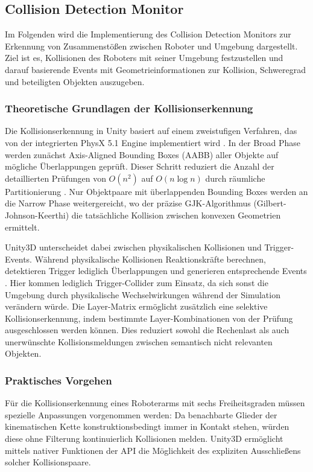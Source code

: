 \subsection{Collision Detection Monitor}
Im Folgenden wird die Implementierung des Collision Detection
Monitors zur Erkennung von Zusammenstößen zwischen
Roboter und Umgebung dargestellt. Ziel ist es, Kollisionen des
Roboters mit seiner Umgebung festzustellen und darauf basierende Events mit
Geometrieinformationen zur Kollision, Schweregrad und beteiligten
Objekten auszugeben.

\subsubsection{Theoretische Grundlagen der Kollisionserkennung}
Die Kollisionserkennung in Unity basiert auf einem zweistufigen Verfahren, das
von der integrierten PhysX 5.1 Engine implementiert wird
. In der Broad Phase werden zunächst
Axis-Aligned Bounding Boxes (AABB) aller Objekte auf mögliche Überlappungen
geprüft. Dieser Schritt reduziert die Anzahl der detaillierten Prüfungen von
$O(n^2)$ auf $O(n \log n)$ durch räumliche Partitionierung
. Nur Objektpaare mit überlappenden Bounding Boxes
werden an die Narrow Phase weitergereicht, wo der präzise
GJK-Algorithmus (Gilbert-Johnson-Keerthi) die tatsächliche Kollision zwischen
konvexen Geometrien ermittelt.

Unity3D unterscheidet dabei zwischen physikalischen Kollisionen und
Trigger-Events. Während physikalische Kollisionen Reaktionskräfte berechnen,
detektieren Trigger lediglich Überlappungen und generieren entsprechende Events
. Hier kommen lediglich Trigger-Collider
zum Einsatz,
da sich sonst die Umgebung durch physikalische Wechselwirkungen während der
Simulation verändern würde. Die Layer-Matrix ermöglicht zusätzlich
eine selektive
Kollisionserkennung, indem bestimmte Layer-Kombinationen von der Prüfung
ausgeschlossen werden können. Dies reduziert sowohl die Rechenlast als auch
unerwünschte Kollisionsmeldungen zwischen semantisch nicht relevanten Objekten.

\subsubsection{Praktisches Vorgehen}
Für die Kollisionserkennung eines Roboterarms mit sechs Freiheitsgraden müssen
spezielle Anpassungen vorgenommen werden: Da benachbarte Glieder der
kinematischen Kette konstruktionsbedingt immer in Kontakt stehen, würden diese
ohne Filterung kontinuierlich Kollisionen melden. Unity3D ermöglicht mittels
nativer Funktionen der API die Möglichkeit des expliziten Ausschließens
solcher Kollisionspaare.

